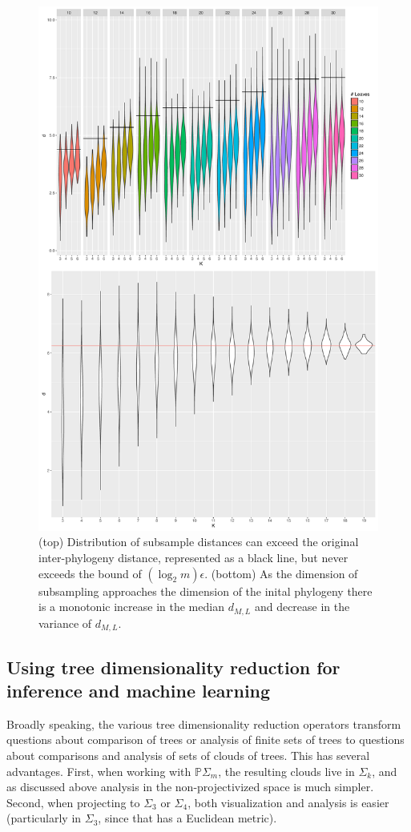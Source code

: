 \documentclass[a4paper,11pt]{article}
\begin{document}
\begin{figure}[t!]
    \centering
    \includegraphics[width=0.8\linewidth]{../figures/dimred_calibration.pdf}
    \caption{(top) Distribution of subsample distances can exceed the original inter-phylogeny distance, represented as a black line, but never exceeds the bound of $(\log_2 m)\epsilon$. (bottom) As the dimension of subsampling approaches the dimension of the inital phylogeny there is a monotonic increase in the median $d_{M,L}$ and decrease in the variance of $d_{M,L}$.}
    \label{fig:dimred_calibration}
\end{figure}

\subsection{Using tree dimensionality reduction for inference and machine learning}

Broadly speaking, the various tree dimensionality reduction operators transform questions about comparison of trees or analysis of finite sets of trees to questions about comparisons and analysis of sets of clouds of trees.
This has several advantages.
First, when working with $\mathbb{P}\Sigma_m$, the resulting clouds live in $\Sigma_k$, and as discussed above analysis in the non-projectivized space is much simpler.
Second, when projecting to $\Sigma_3$ or $\Sigma_4$, both visualization and analysis is easier (particularly in $\Sigma_3$, since that has a Euclidean metric).
\end{document}
